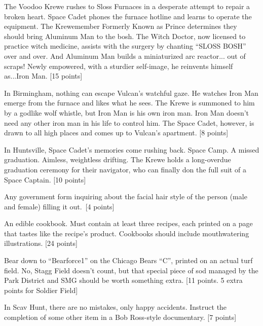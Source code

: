 \documentclass{book}
\begin{document}
\begin{list}{}{}
\item The Voodoo Krewe rushes to Sloss Furnaces in a desperate attempt to repair a broken heart. Space Cadet phones the furnace hotline and learns to operate the equipment. The Krewemember Formerly Known as Prince determines they should bring Aluminum Man to the bosh.  The Witch Doctor, now licensed to practice witch medicine, assists with the surgery by chanting ``SLOSS BOSH'' over and over.  And Aluminum Man builds a miniaturized arc reactor... out of scraps! Newly empowered, with a sturdier self-image, he reinvents himself as...Iron Man. [15 points]

\item In Birmingham, nothing can escape Vulcan's watchful gaze. He watches Iron Man emerge from the furnace and likes what he sees.  The Krewe is summoned to him by a godlike wolf whistle, but Iron Man is his own iron man.  Iron Man doesn't need any other iron man in his life to control him.  The Space Cadet, however, is drawn to all high places and comes up to Vulcan's apartment. [8 points]

\item In Huntsville, Space Cadet's memories come rushing back. Space Camp. A missed graduation. Aimless, weightless drifting. The Krewe holds a long-overdue graduation ceremony for their navigator, who can finally don the full suit of a Space Captain. [10 points] 

\item Any government form inquiring about the facial hair style of the person (male and female) filling it out.~[4 points]

\item An edible cookbook. Must contain at least three recipes, each printed on a page that tastes like the recipe's product. Cookbooks should include mouthwatering illustrations. [24 points] 




\newpage





\item Bear down to ``Bearforce1'' on the Chicago Bears ``C'', printed on an actual turf field. No, Stagg Field doesn't count, but that special piece of sod managed by the Park District and SMG should be worth something extra. [11 points. 5 extra points for Soldier Field]

\item In Scav Hunt, there are no mistakes, only happy accidents. Instruct  the completion of some other item in a Bob Ross-style documentary. [7 points]


\end{list}
\end{document}
